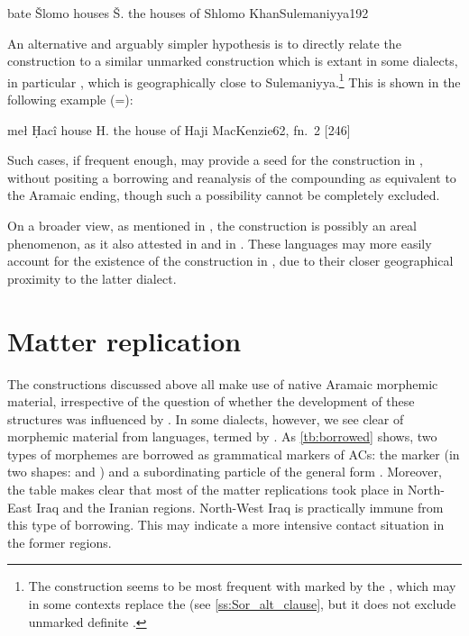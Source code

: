 {bate Šlomo}
{houses Š.}
{the houses of Shlomo}
{KhanSulemaniyya}{192}

An alternative and arguably simpler hypothesis is  to directly relate the   construction to a similar unmarked  construction which is extant in some \Sor dialects, in particular \War, which is geographically close to Sulemaniyya.\footnote{The \War {} construction seems to be most frequent with \prims marked by the   \citep[62, fn.\ 2]{MacKenzie}, which may in some contexts replace the \ez* (see \ref{ss:Sor_alt_clause}, but it does not exclude unmarked definite \prims.} This is shown in the following  example (=):

{meł Ḥacî}
{house H.}
{the house of Haji}
{MacKenzie}{62, fn.\ 2 {[246]}}








Such cases, if frequent enough, may provide a seed for the  construction in \JSul, without positing a borrowing and reanalysis  of the compounding \ez* as equivalent to the Aramaic \free* ending, though such a possibility cannot be completely excluded.


On a broader view, as mentioned in , the  construction is possibly an areal phenomenon, as it also attested in  and in \Per. These languages may more easily account for the existence of the  construction in \JSan, due to their closer geographical proximity to the latter dialect.

 





\section{Matter replication}\label{ss:matter-replication}

The constructions discussed above all make use of native Aramaic morphemic material, irrespective of the question of whether the development of these structures was influenced by . In some dialects, however, we see clear  of morphemic material from  languages, termed by \citet{MatrasSakel} . As \vref{tb:borrowed} shows, two types of morphemes are borrowed as grammatical markers of ACs: the \ez* marker (in two shapes:  and ) and a subordinating particle of the general form . Moreover, the table makes clear that most of the matter replications took place in North-East Iraq and the Iranian regions. North-West Iraq is practically immune from this type of borrowing. This may indicate a more intensive contact situation in the former regions.

